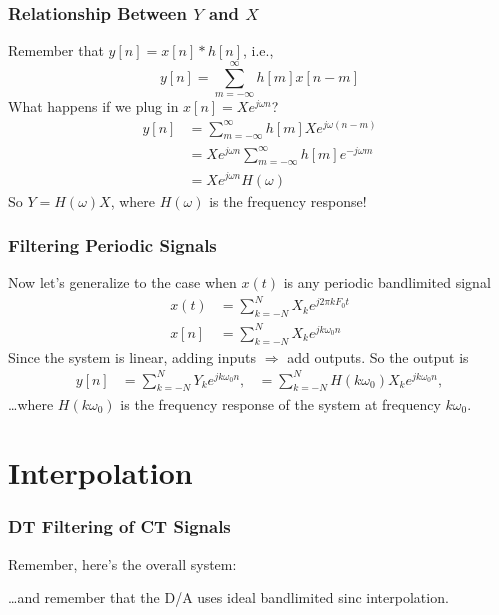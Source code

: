 \documentclass{beamer}
\begin{document}
\begin{frame}
  \frametitle{Relationship Between $Y$ and $X$}

  Remember that $y[n]=x[n]\ast h[n]$, i.e.,
  \begin{displaymath}
    y[n] = \sum_{m=-\infty}^\infty h[m]x[n-m]
  \end{displaymath}
  What happens if we plug in $x[n]=Xe^{j\omega n}$?
  \begin{align*}
    y[n] &= \sum_{m=-\infty}^\infty h[m]Xe^{j\omega(n-m)}\\
    &= Xe^{j\omega n}\sum_{m=-\infty}^\infty h[m]e^{-j\omega m}\\
    &= X e^{j\omega n}H(\omega) 
  \end{align*}
  So $Y=H(\omega)X$, where $H(\omega)$ is the frequency response!
\end{frame}

\begin{frame}
  \frametitle{Filtering Periodic Signals}

  Now let's generalize to the case when $x(t)$ is any periodic
  bandlimited signal
  \begin{align*}
    x(t)&=\sum_{k=-N}^{N}X_ke^{j2\pi kF_0t}\\
    x[n]&=\sum_{k=-N}^{N}X_ke^{jk\omega_0n}
  \end{align*}
  Since the system is linear, adding inputs $\Rightarrow$ add outputs.
  So the output is
  \begin{align*}
    y[n]&=\sum_{k=-N}^{N}Y_ke^{jk\omega_0n},
    &=\sum_{k=-N}^{N}H(k\omega_0)X_ke^{jk\omega_0n},
  \end{align*}
  \ldots where $H(k\omega_0)$ is the frequency response of the system
  at frequency $k\omega_0$.
\end{frame}

\section{Interpolation}
\setcounter{subsection}{1}

\begin{frame}
  \frametitle{DT Filtering of CT Signals}

  Remember, here's the overall system:

  \begin{center}
  \end{center}
  \ldots and remember that the D/A uses ideal bandlimited sinc interpolation.
\end{frame}
\end{document}
